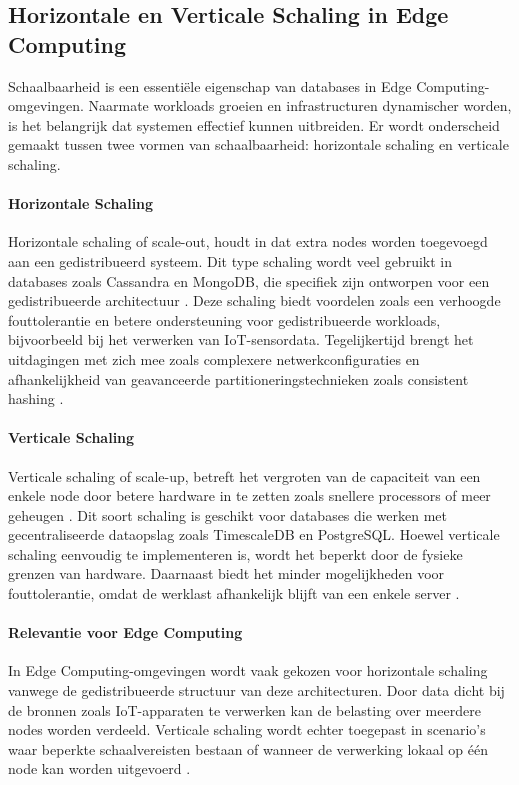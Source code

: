 \subsection{Horizontale en Verticale Schaling in Edge Computing}

Schaalbaarheid is een essentiële eigenschap van databases in Edge Computing-omgevingen. Naarmate workloads groeien en infrastructuren dynamischer worden, is het belangrijk dat systemen effectief kunnen uitbreiden. Er wordt onderscheid gemaakt tussen twee vormen van schaalbaarheid: horizontale schaling en verticale schaling.

\paragraph{Horizontale Schaling}
Horizontale schaling of scale-out, houdt in dat extra nodes worden toegevoegd aan een gedistribueerd systeem. Dit type schaling wordt veel gebruikt in databases zoals Cassandra en MongoDB, die specifiek zijn ontworpen voor een gedistribueerde architectuur \autocite{Kleppmann2017}.  
Deze schaling biedt voordelen zoals een verhoogde fouttolerantie en betere ondersteuning voor gedistribueerde workloads, bijvoorbeeld bij het verwerken van IoT-sensordata. 
Tegelijkertijd brengt het uitdagingen met zich mee zoals complexere netwerkconfiguraties en afhankelijkheid van geavanceerde partitioneringstechnieken zoals consistent hashing \autocite{Mahmud2020}.

\paragraph{Verticale Schaling}
Verticale schaling of scale-up, betreft het vergroten van de capaciteit van een enkele node door betere hardware in te zetten zoals snellere processors of meer geheugen \autocite{Ponnusamy2024}. 
Dit soort schaling is geschikt voor databases die werken met gecentraliseerde dataopslag zoals TimescaleDB en PostgreSQL. 
Hoewel verticale schaling eenvoudig te implementeren is, wordt het beperkt door de fysieke grenzen van hardware. 
Daarnaast biedt het minder mogelijkheden voor fouttolerantie, omdat de werklast afhankelijk blijft van een enkele server \autocite{Mahmud2020}.

\paragraph{Relevantie voor Edge Computing}
In Edge Computing-omgevingen wordt vaak gekozen voor horizontale schaling vanwege de gedistribueerde structuur van deze architecturen. 
Door data dicht bij de bronnen zoals IoT-apparaten te verwerken kan de belasting over meerdere nodes worden verdeeld. 
Verticale schaling wordt echter toegepast in scenario's waar beperkte schaalvereisten bestaan of wanneer de verwerking lokaal op één node kan worden uitgevoerd \autocite{Kleppmann2017}.


